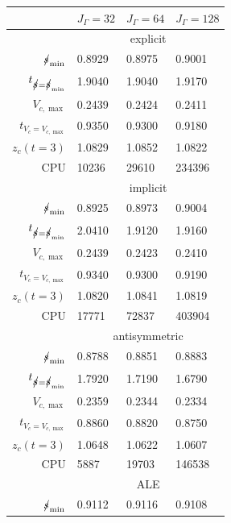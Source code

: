 \begin{table}
\center
\hspace*{-3.25cm}
\begin{tabular}{rlll}
\hline
 & $J_\Gamma=32$ & $J_\Gamma=64$ & $J_\Gamma=128$ \\
\hline
& \multicolumn{3}{c}{explicit} \\
\cmidrule{2-4}
$\mbox{$s\!\!\!\!\:/$}_{\min}$                & 0.8929 & 0.8975 & 0.9001 \\
$t_{\strikes = \strikes_{\min}}$ & 1.9040 & 1.9040 & 1.9170 \\
$V_{c,\max}$                     & 0.2439 & 0.2424 & 0.2411 \\
$t_{V_c = V_{c,\max}}$           & 0.9350 & 0.9300 & 0.9180 \\
$z_c(t=3)$                       & 1.0829 & 1.0852 & 1.0822 \\
CPU                              &  10236 &  29610 & 234396 \\
\cmidrule{2-4}
& \multicolumn{3}{c}{implicit} \\
\cmidrule{2-4}
$\mbox{$s\!\!\!\!\:/$}_{\min}$                & 0.8925 & 0.8973 & 0.9004 \\
$t_{\strikes = \strikes_{\min}}$ & 2.0410 & 1.9120 & 1.9160 \\
$V_{c,\max}$                     & 0.2439 & 0.2423 & 0.2410 \\
$t_{V_c = V_{c,\max}}$           & 0.9340 & 0.9300 & 0.9190 \\
$z_c(t=3)$                       & 1.0820 & 1.0841 & 1.0819 \\
CPU                              &  17771 &  72837 & 403904 \\
\cmidrule{2-4}
& \multicolumn{3}{c}{antisymmetric} \\
\cmidrule{2-4}
$\mbox{$s\!\!\!\!\:/$}_{\min}$                & 0.8788 & 0.8851 & 0.8883 \\
$t_{\strikes = \strikes_{\min}}$ & 1.7920 & 1.7190 & 1.6790 \\
$V_{c,\max}$                     & 0.2359 & 0.2344 & 0.2334 \\
$t_{V_c = V_{c,\max}}$           & 0.8860 & 0.8820 & 0.8750 \\
$z_c(t=3)$                       & 1.0648 & 1.0622 & 1.0607 \\
CPU                              &   5887 &  19703 & 146538 \\
\cmidrule{2-4}
& \multicolumn{3}{c}{ALE} \\
\cmidrule{2-4}
$\mbox{$s\!\!\!\!\:/$}_{\min}$                & 0.9112 & 0.9116 & 0.9108 \\

\end{tabular}
\end{table}
